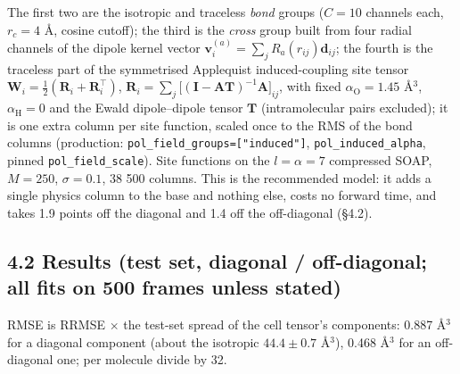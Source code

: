 \documentclass[11pt,a4paper]{article}
\begin{document}
The first two are the isotropic and traceless \emph{bond} groups (\(C=10\) channels each,
\(r_c = 4\) \AA{}, cosine cutoff); the third is the \emph{cross} group built from four radial
channels of the dipole kernel vector \(\mathbf v^{(a)}_i=\sum_j R_a(r_{ij})\mathbf d_{ij}\); the
fourth is the traceless part of the symmetrised Applequist induced-coupling site tensor
\(\mathbf W_i=\tfrac12(\mathbf R_i+\mathbf R_i^\top)\),
\(\mathbf R_i=\sum_j\big[(\mathbf I-\mathbf A\mathbf T)^{-1}\mathbf A\big]_{ij}\), with fixed
\(\alpha_\mathrm O=1.45\) \AA{}\(^3\), \(\alpha_\mathrm H=0\) and the Ewald dipole--dipole tensor
\(\mathbf T\) (intramolecular pairs excluded); it is one extra column per site function, scaled once
to the RMS of the bond columns (production: \texttt{pol\_field\_groups={[}"induced"{]}},
\texttt{pol\_induced\_alpha}, pinned \texttt{pol\_field\_scale}). Site functions on the
\(l=\alpha=7\) compressed SOAP, \(M=250\), \(\sigma=0.1\), 38 500 columns. This is the recommended
model: it adds a single physics column to the base and nothing else, costs no forward time, and
takes 1.9 points off the diagonal and 1.4 off the off-diagonal (§4.2).

\subsection{4.2 Results (test set, diagonal / off-diagonal; all fits on 500 frames unless
stated)}\label{results-test-set-diagonal-off-diagonal-all-fits-on-500-frames-unless-stated}

RMSE is RRMSE \(\times\) the test-set spread of the cell tensor's components: 0.887 \AA{}\(^3\) for
a diagonal component (about the isotropic \(44.4\pm0.7\) \AA{}\(^3\)), 0.468 \AA{}\(^3\) for an
off-diagonal one; per molecule divide by 32.
\end{document}
